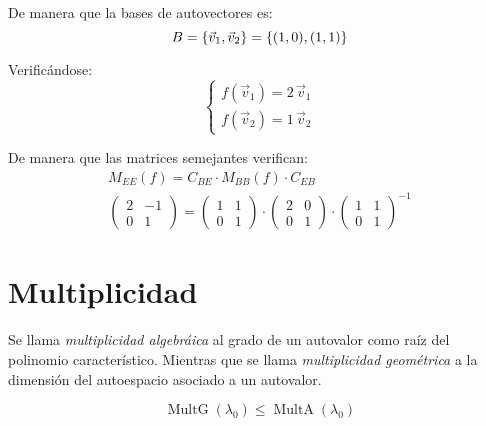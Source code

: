 \begin{mdframed}[style=ExampleFrame]
    De manera que la bases de autovectores es:
    \begin{equation*}
        B = { \left\{ {\Vec{v}_1 , \Vec{v}_2} \right\} } = { \left\{ {(1,0),(1,1)} \right\} }
    \end{equation*}
    
    Verificándose:
    \begin{equation*}
        \left\{
        \begin{aligned}
            f(\Vec{v}_1) = 2 \, \Vec{v}_1
            \\
            f(\Vec{v}_2) = 1 \, \Vec{v}_2
        \end{aligned}
        \right.
    \end{equation*}
    
    De manera que las matrices semejantes verifican:
    \begin{gather*}
        M_{EE}(f) = C_{BE} \cdot M_{BB}(f) \cdot C_{EB}
        \\
        \begin{pmatrix}
            2 & -1
            \\
            0 & 1
        \end{pmatrix}
        =
        \begin{pmatrix}
            1 & 1
            \\
            0 & 1
        \end{pmatrix}
        \cdot
        \begin{pmatrix}
            2 & 0
            \\
            0 & 1
        \end{pmatrix}
        \cdot
        \begin{pmatrix}
            1 & 1
            \\
            0 & 1
        \end{pmatrix}^{-1}
    \end{gather*}
\end{mdframed}


\section{Multiplicidad}

Se llama \emph{multiplicidad algebráica} al grado de un autovalor como raíz del polinomio característico.
Mientras que se llama \emph{multiplicidad geométrica} a la dimensión del autoespacio asociado a un autovalor.

\begin{mdframed}[style=PropertyFrame]
    \begin{prop}
    \end{prop}
    \begin{equation*}
        \operatorname{MultG} (\lambda_0) \leq \operatorname{MultA} (\lambda_0)
    \end{equation*}
\end{mdframed}

